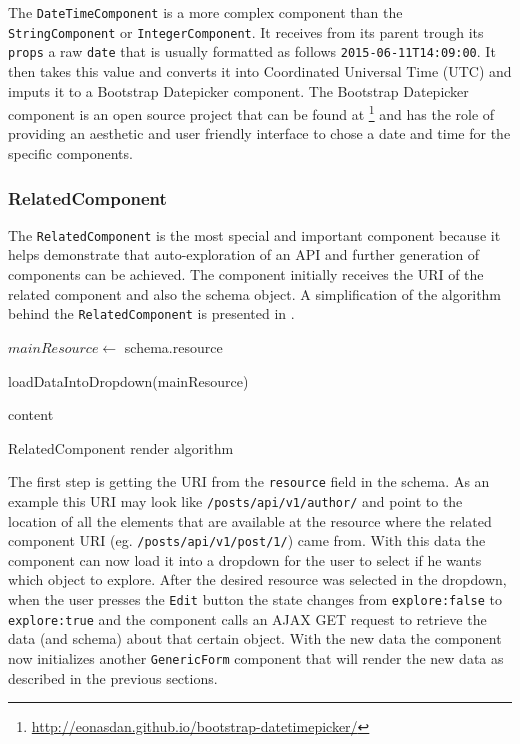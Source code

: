 The \texttt{DateTimeComponent} is a more complex component than the \texttt{StringComponent} or \texttt{IntegerComponent}. It receives from its parent trough its \texttt{props} a raw \texttt{date} that is usually formatted as follows \texttt{2015-06-11T14:09:00}. It then takes this value and converts it into 
Coordinated Universal Time (UTC) and imputs it to a Bootstrap Datepicker component. The Bootstrap Datepicker component is an open source project that can be found at \footnote{\url{http://eonasdan.github.io/bootstrap-datetimepicker/}} and has the role of providing an aesthetic and user friendly interface to chose a date and time for the specific components.

\subsubsection{RelatedComponent}
\label{sub-sub-sec:related}

The \texttt{RelatedComponent} is the most special and important component because it helps demonstrate that auto-exploration of an API and further generation of components can be achieved. The component initially receives the URI of the related component and also the schema object. A simplification of the algorithm behind the \texttt{RelatedComponent} is presented in .

\begin{algorithm}[H]
	
	$mainResource \leftarrow $ schema.resource
	
	loadDataIntoDropdown(mainResource)
	
	\Return content
	\label{algo2}
	\caption{RelatedComponent render algorithm}
\end{algorithm}

The first step is getting the URI from the \texttt{resource} field in the schema. As an example this URI may look like \texttt{/posts/api/v1/author/} and point to the location of all the elements that are available at the resource where the related component URI (eg. \texttt{/posts/api/v1/post/1/}) came from. With this data the component can now load it into a dropdown for the user to select if he wants which object to explore. After the desired resource was selected in the dropdown, when the user presses the \texttt{Edit} button the state changes from \texttt{explore:false} to \texttt{explore:true} and the component calls an AJAX GET request to retrieve the data (and schema) about that certain object. With the new data the component now initializes another \texttt{GenericForm} component that will render the new data as described in the previous sections. 
